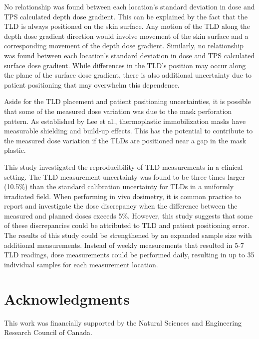No relationship was found between each location’s standard deviation in dose and TPS calculated depth dose gradient. This can be explained by the fact that the TLD is always positioned on the skin surface. Any motion of the TLD along the depth dose gradient direction would involve movement of the skin surface and a corresponding movement of the depth dose gradient. Similarly, no relationship was found between each location’s standard deviation in dose and TPS calculated surface dose gradient. While differences in the TLD’s position may occur along the plane of the surface dose gradient, there is also additional uncertainty due to patient positioning that may overwhelm this dependence.

Aside for the TLD placement and patient positioning uncertainties, it is possible that some of the measured dose variation was due to the mask perforation pattern. As established by Lee et al.\cite{Lee2002}, thermoplastic immobilization masks have measurable shielding and build-up effects. This has the potential to contribute to the measured dose variation if the TLDs are positioned near a gap in the mask plastic.

This study investigated the reproducibility of TLD measurements in a clinical setting. The TLD measurement uncertainty was found to be three times larger (10.5\%) than the standard calibration uncertainty for TLDs in a uniformly irradiated field. When performing in vivo dosimetry, it is common practice to report and investigate the dose discrepancy when the difference between the measured and planned doses exceeds 5\%.\cite{Essers1999} However, this study suggests that some of these discrepancies could be attributed to TLD and patient positioning error. The results of this study could be strengthened by an expanded sample size with additional measurements. Instead of weekly measurements that resulted in 5-7 TLD readings, dose measurements could be performed daily, resulting in up to 35 individual samples for each measurement location.

\section*{Acknowledgments}
This work was financially supported by the Natural Sciences and Engineering Research Council of Canada.